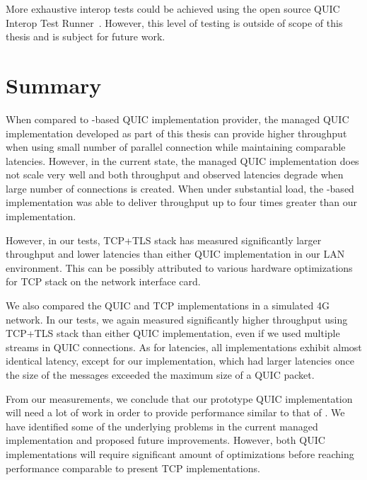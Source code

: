 More exhaustive interop tests could be achieved using the open source QUIC Interop Test
Runner~\cite{QuicInteropRunner}. However, this level of testing is outside of scope of this thesis
and is subject for future work.

\section{Summary}

When compared to \libmsquic{}-based QUIC implementation provider, the managed QUIC implementation
developed as part of this thesis can provide higher throughput when using small number of parallel
connection while maintaining comparable latencies. However, in the current state, the managed QUIC
implementation does not scale very well and both throughput and observed latencies degrade when
large number of connections is created. When under substantial load, the \libmsquic{}-based
implementation was able to deliver throughput up to four times greater than our implementation.

However, in our tests, TCP+TLS stack has measured significantly larger throughput and lower
latencies than either QUIC implementation in our LAN environment. This can be possibly attributed to
various hardware optimizations for TCP stack on the network interface card.

We also compared the QUIC and TCP implementations in a simulated 4G network. In our tests, we again
measured significantly higher throughput using TCP+TLS stack than either QUIC implementation, even
if we used multiple streams in QUIC connections. As for latencies, all implementations exhibit
almost identical latency, except for our implementation, which had larger latencies once the size of
the messages exceeded the maximum size of a QUIC packet.

From our measurements, we conclude that our prototype QUIC implementation will need a lot of work in
order to provide performance similar to that of \libmsquic{}. We have identified some of the
underlying problems in the current managed implementation and proposed future improvements. However,
both QUIC implementations will require significant amount of optimizations before reaching
performance comparable to present TCP implementations.
